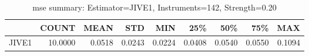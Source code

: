 \begin{table}[ht]
\centering
\caption{mse summary: Estimator=JIVE1, Instruments=142, Strength=0.20}
\begin{tabular}{lrrrrrrrr}
\toprule
 & COUNT & MEAN & STD & MIN & 25\% & 50\% & 75\% & MAX \\
\midrule
JIVE1 & 10.0000 & 0.0518 & 0.0243 & 0.0224 & 0.0408 & 0.0540 & 0.0550 & 0.1094 \\
\bottomrule
\end{tabular}
\end{table}
